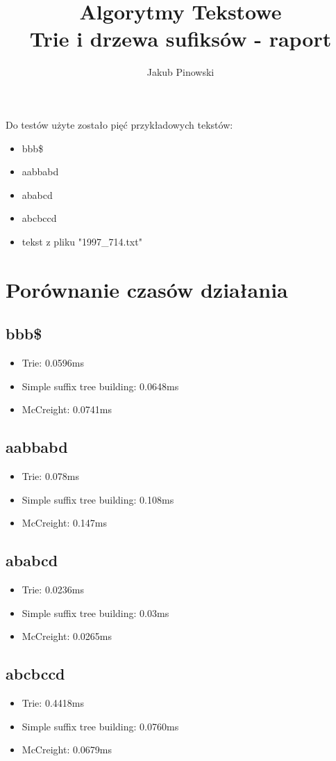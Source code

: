 \documentclass{article}
\title{Algorytmy Tekstowe\\Trie i drzewa sufiksów - raport}
\author{Jakub Pinowski}
\date{}
\begin{document}
	\maketitle
	Do testów użyte zostało pięć przykładowych tekstów:
	\begin{itemize}
    \item bbb\$
    \item aabbabd
    \item ababcd
    \item abcbccd
    \item tekst z pliku "1997\_714.txt"
	\end{itemize}
	
	\section{Porównanie czasów działania}
	\subsection{bbb\$}
		\begin{itemize}
		\item Trie: 0.0596ms
		\item Simple suffix tree building: 0.0648ms
		\item McCreight: 0.0741ms
		\end{itemize}
		
	\subsection{aabbabd}
		\begin{itemize}
		\item Trie: 0.078ms
		\item Simple suffix tree building: 0.108ms
		\item McCreight: 0.147ms
		\end{itemize}
	
	\subsection{ababcd}
		\begin{itemize}
		\item Trie: 0.0236ms
		\item Simple suffix tree building: 0.03ms
		\item McCreight: 0.0265ms
		\end{itemize}
		
	\subsection{abcbccd}
		\begin{itemize}
		\item Trie: 0.4418ms
		\item Simple suffix tree building: 0.0760ms
		\item McCreight: 0.0679ms
		\end{itemize}
		
\end{document}

